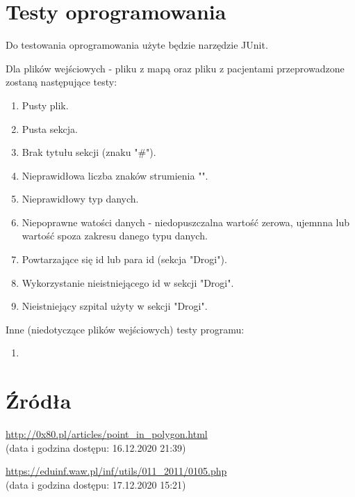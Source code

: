 \documentclass[10pt,a4paper]{article}
\begin{document}
\section{Testy oprogramowania}

Do testowania oprogramowania użyte będzie narzędzie JUnit.

Dla plików wejściowych - pliku z mapą oraz pliku z pacjentami przeprowadzone zostaną następujące testy:
 
\begin{enumerate}
    \item Pusty plik.
    \item Pusta sekcja.
    \item Brak tytułu sekcji (znaku "\#").
    \item Nieprawidłowa liczba znaków strumienia "\textbar".
    \item Nieprawidłowy typ danych.
    \item Niepoprawne watości danych - niedopuszczalna wartość zerowa, ujemnna lub wartość spoza zakresu danego typu danych.
    \item Powtarzające się id lub para id (sekcja "Drogi").
    \item Wykorzystanie nieistniejącego id w sekcji "Drogi".
    \item Nieistniejący szpital użyty w sekcji "Drogi".
\end{enumerate}

Inne (niedotyczące plików wejściowych) testy programu:
\begin{enumerate}
    \item
\end{enumerate}


\section{Źródła}

\begin{enumerate}[{[1]}]
    \item \url{http://0x80.pl/articles/point_in_polygon.html} \\(data i godzina dostępu: 16.12.2020 21:39)
    \item \url{https://eduinf.waw.pl/inf/utils/011_2011/0105.php} \\(data i godzina dostępu: 17.12.2020 15:21)
\end{enumerate}
\end{document}
